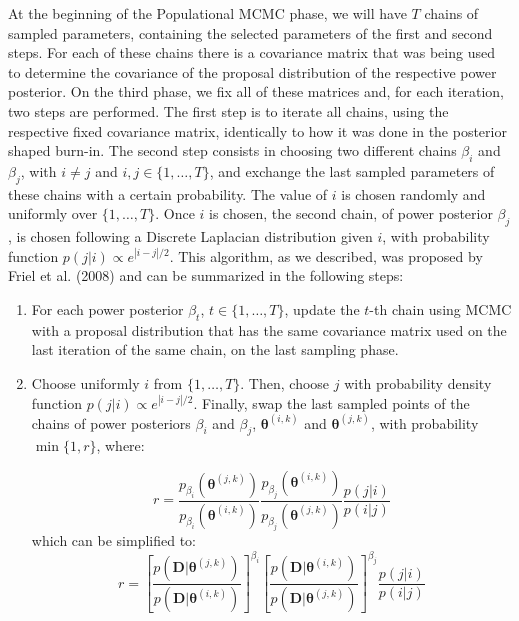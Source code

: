 At the beginning of the Populational MCMC phase, we will have $T$ chains of 
sampled parameters, containing the selected parameters of the first and 
second steps. For each of these chains there is a covariance matrix that 
was being used to determine the covariance of the proposal distribution 
of the respective power posterior. On the third phase, we fix all of 
these matrices and, for each iteration, two steps are performed. The 
first step is to iterate all chains, using the respective fixed 
covariance matrix, identically to how it was done in the posterior
shaped burn-in. The second step consists in choosing two different
chains $\beta_i$ and $\beta_j$, with $i \neq j$ and $i, j \in \{1,
\ldots, T\}$, and exchange the last sampled parameters of these chains
with a certain probability. The value of $i$ is chosen randomly and
uniformly over $\{1, \ldots, T\}$. Once $i$ is chosen, the second chain,
of power posterior $\beta_j$, is chosen following a Discrete Laplacian
distribution given $i$, with probability function $p (j | i) \propto
e^{|i - j| / 2}$. This algorithm, as we described, was proposed by Friel
et al. (2008) and can  be summarized in the following steps:
\begin{enumerate}
    \item{For each power posterior $\beta_t$, $t \in \{1, \ldots, T\}$, 
        update the $t$-th chain using MCMC with a proposal distribution
        that has the same covariance matrix used on the last iteration
        of the same chain, on the last sampling phase.}
    \item{Choose uniformly $i$ from $\{1, \ldots, T\}$. Then, choose
        $j$ with probability density function $p (j | i) \propto 
        e^{|i - j| / 2}$. Finally, swap the last sampled points of 
        the chains of power posteriors $\beta_i$ and $\beta_j$, 
        ${\bm \theta}^{(i, k)}$ and ${\bm \theta}^{(j, k)}$, with 
        probability $\min\{1, r\}$, where: }

    \begin{equation*}
        r = \frac{p_{\beta_i}\left({\bm \theta}^{(j, k)}\right)}
             {p_{\beta_i}\left({\bm \theta}^{(i, k)}\right)}
        \frac{p_{\beta_j}\left({\bm \theta}^{(i, k)}\right)}
             {p_{\beta_j}\left({\bm \theta}^{(j, k)}\right)}
        \frac{p (j | i)}
             {p (i | j)}
    \end{equation*}
    which can be simplified to:
    \begin{equation*}
        r = \left[\frac{p \left({\bm D} | {\bm \theta}^{(j, k)}\right)}
                {p \left({\bm D} | {\bm \theta}^{(i,
                k)}\right)}\right]^{\beta_i}
            \left[\frac{p \left({\bm D} | {\bm \theta}^{(i, k)}\right)}
                {p \left({\bm D} | {\bm \theta}^{(j,
                k)}\right)}\right]^{\beta_j}
            \frac{p (j | i)}
                 {p (i | j)}
    \end{equation*}
\end{enumerate}

